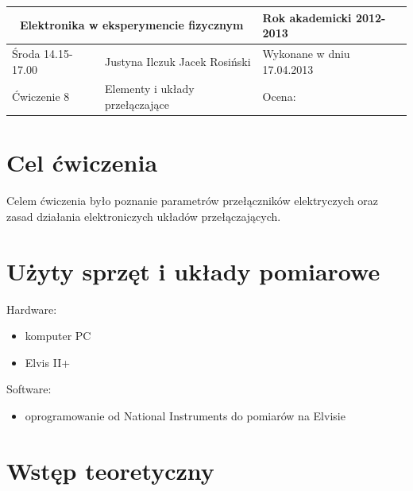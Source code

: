 \documentclass[a4paper,11pt]{article}
\author{Justyna Ilczuk, Jacek Rosiński}
\begin{document}
\begin{center}

    \begin{tabular}{ | m{5cm}| m{5cm} | m{5cm} |}
    \hline 
    \multicolumn{2}{|c|}{Elektronika w eksperymencie fizycznym}
    & Rok akademicki 2012-2013 \\ 
    
    \hline
    Środa 14.15-17.00 
    & Justyna Ilczuk \newline Jacek Rosiński
    & Wykonane w dniu 17.04.2013 \\
   	
   	\hline
   	Ćwiczenie 8 & Elementy i układy przełączające &    Ocena: \\
   	\hline
    \end{tabular}
\end{center}

\pagestyle{fancy}
\fancyfoot[CO]{\ }
\fancyhead[RO]{\footnotesize{\thepage} }




\section{Cel ćwiczenia}
Celem ćwiczenia było poznanie parametrów przełączników elektryczych oraz zasad działania elektroniczych układów przełączających.

\section{Użyty sprzęt i układy pomiarowe}

Hardware:
\begin{itemize}
\item komputer PC
\item Elvis II+
\end{itemize}

Software:
\begin{itemize}
\item oprogramowanie od National Instruments do pomiarów na Elvisie

\end{itemize}

\section{Wstęp teoretyczny}
\end{document}
